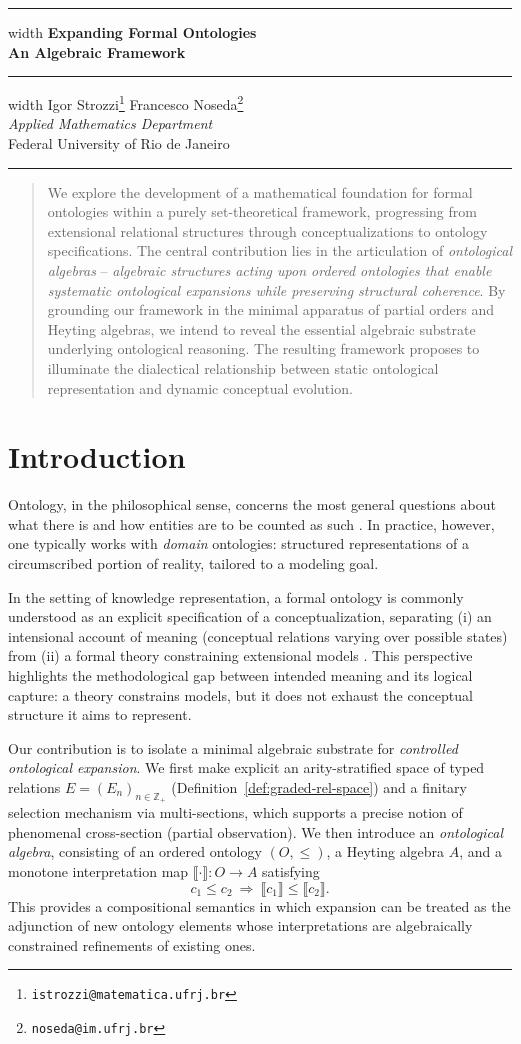 \documentclass[12pt,a4paper]{article}
\date{\today}
\makeatletter
\newcommand{\sem}[1]{\llbracket #1 \rrbracket}
\newcommand{\nomeautorum}{Igor Strozzi}
\newcommand{\nomeautordois}{Francesco Noseda}
\newcommand{\emailum}{istrozzi@matematica.ufrj.br}
\newcommand{\emaildois}{noseda@im.ufrj.br}
\newcommand{\ctitle}{Expanding Formal Ontologies \vspace{0.5cm}
	\\\Large{An Algebraic Framework}}
\newcommand{\maketitlecustom}{
	\thispagestyle{empty}
	\begin{center}
		\hrule height 2pt width \textwidth
		\vspace{0.4cm}
		{\LARGE \textbf{\ctitle}} \\[0.4cm]
		\hrule height 2pt width \textwidth
		\vspace{0.8cm}
		{\Large \nomeautorum\footnote{\texttt{\emailum}} \quad \nomeautordois\footnote{\texttt{\emaildois}}} \\
		\vspace{0.8cm}
		\large{\textit{Applied Mathematics Department}\\
			Federal University of Rio de Janeiro}
	\end{center}
	\vspace{0.5cm}
	\hrule height 1pt
	\vspace{0.5cm}
}
\makeatother
\begin{document}
\maketitlecustom


\begin{abstract}
\large{We explore the development of a mathematical foundation for formal ontologies within a purely set-theoretical framework, progressing from extensional relational structures through conceptualizations to ontology specifications. The central contribution lies in the articulation of \emph{ontological algebras} -- \textit{algebraic structures acting upon ordered ontologies that enable systematic ontological expansions while preserving structural coherence}. By grounding our framework in the minimal apparatus of partial orders and Heyting algebras, we intend to reveal the essential algebraic substrate underlying ontological reasoning. The resulting framework proposes to illuminate the dialectical relationship between static ontological representation and dynamic conceptual evolution.}
\end{abstract}

\newpage
\tableofcontents
\newpage
\section{Introduction}

Ontology, in the philosophical sense, concerns the most general questions about what there is and how entities are to be counted as such \citep{quine1948, vaninwagen1993, lowe2002survey}. In practice, however, one typically works with \emph{domain} ontologies: structured representations of a circumscribed portion of reality, tailored to a modeling goal.

In the setting of knowledge representation, a formal ontology is commonly understood as an explicit specification of a conceptualization, separating (i) an intensional account of meaning (conceptual relations varying over possible states) from (ii) a formal theory constraining extensional models \citep{gruber1993, gruber1995, uschold1996, studer1998, guarino1995clarification, guarino1998, guarino2009}. This perspective highlights the methodological gap between intended meaning and its logical capture: a theory constrains models, but it does not exhaust the conceptual structure it aims to represent.

Our contribution is to isolate a minimal algebraic substrate for \emph{controlled ontological expansion}. We first make explicit an arity-stratified space of typed relations $E=(E_n)_{n\in\mathbb Z_+}$ (Definition~\ref{def:graded-rel-space}) and a finitary selection mechanism via multi-sections, which supports a precise notion of phenomenal cross-section (partial observation). We then introduce an \emph{ontological algebra}, consisting of an ordered ontology $(O,\le)$, a Heyting algebra $A$, and a monotone interpretation map $\sem{\cdot}:O\to A$ satisfying
$$
c_1\le c_2 \ \Longrightarrow\ \sem{c_1}\le \sem{c_2}.
$$
This provides a compositional semantics in which expansion can be treated as the adjunction of new ontology elements whose interpretations are algebraically constrained refinements of existing ones.
\end{document}
